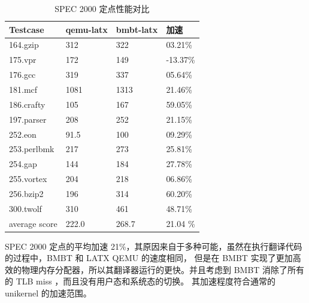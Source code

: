 \begin{table}[!ht]
	\centering
	\caption{SPEC 2000 定点性能对比}
	\begin{tabular}{|l|l|l|l|}
		\hline
		Testcase      & qemu-latx & bmbt-latx & 加速     \\ \hline
		164.gzip      & 312       & 322       & 03.21\%  \\ \hline
		175.vpr       & 172       & 149       & -13.37\% \\ \hline
		176.gcc       & 319       & 337       & 05.64\%  \\ \hline
		181.mcf       & 1081      & 1313      & 21.46\%  \\ \hline
		186.crafty    & 105       & 167       & 59.05\%  \\ \hline
		197.parser    & 208       & 252       & 21.15\%  \\ \hline
		252.eon       & 91.5      & 100       & 09.29\%  \\ \hline
		253.perlbmk   & 217       & 273       & 25.81\%  \\ \hline
		254.gap       & 144       & 184       & 27.78\%  \\ \hline
		255.vortex    & 204       & 218       & 06.86\%  \\ \hline
		256.bzip2     & 196       & 314       & 60.20\%  \\ \hline
		300.twolf     & 310       & 461       & 48.71\%  \\ \hline
		average score & 222.0     & 268.7     & 21.04 \% \\ \hline
	\end{tabular}
	\label{table:spec2000_latx_qemu_int}
\end{table}

SPEC 2000 定点的平均加速 21\%，其原因来自于多种可能，虽然在执行翻译代码的过程中，BMBT 和 LATX QEMU 的速度相同，
但是在 BMBT 实现了更加高效的物理内存分配器，所以其翻译器运行的更快。并且考虑到 BMBT 消除了所有的 TLB miss ，而且没有用户态和系统态的切换。
其加速程度符合通常的 unikernel 的加速范围。

